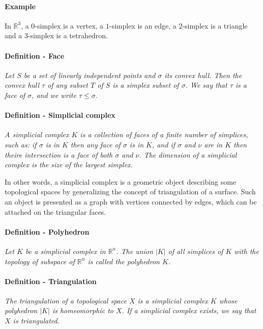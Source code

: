 \paragraph{Example}
{
In $\mathbb{R}^{3}$, a $0$-simplex is a vertex, a $1$-simplex is an edge, a $2$-simplex is a triangle and a $3$-simplex is a tetrahedron.
}

\paragraph{Definition - Face}
{
\it Let $S$ be a set of linearly independent points and $\sigma$ its convex hull. Then the convex hull $\tau$ of any subset $T$ of $S$ is a simplex subset of $\sigma$. We say that $\tau$ is a face of $\sigma$, and we write $\tau \le \sigma$.
}

\paragraph{Definition - Simplicial complex}
{
\it A simplicial complex $K$ is a collection of faces of a finite number of simplices, such as: if $\sigma$ is in $K$ then any face of $\sigma$ is in $K$, and if $\sigma$ and $\nu$ are in $K$ then theire intersection is a face of both $\sigma$ and $\nu$. The dimension of a simplicial complex is the size of the largest simplex.
}

In other words, a simplicial complex is a geometric object describing some topological spaces by generalizing the concept of triangulation of a surface. Such an object is presented as a graph with vertices connected by edges, which can be attached on the triangular faces.

\paragraph{Definition - Polyhedron}
{
\it Let $K$ be a simplicial complex in $\mathbb{R}^{n}$. The union $|K|$ of all simplices of $K$ with the topology of subspace of $\mathbb{R}^{n}$ is called the polyhedron $K$.
}

\paragraph{Definition - Triangulation}
{
\it The triangulation of a topological space $X$ is a simplicial complex $K$ whose polyhedron $|K|$ is homeomorphic to $X$. If a simplicial complex exists, we say that $X$ is triangulated.
}

